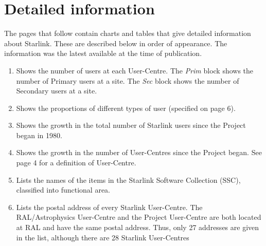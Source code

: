 \documentclass[twoside,11pt]{article}
\newenvironment{latexonly}{}{}
\newcommand{\latexonlysection}[1]{\section{#1}}
\newcommand{\latexonlysection}[1]{#1}
\begin{document}
\begin{latexonly}
\newpage

\latexonlysection{Detailed information}

The pages that follow contain charts and tables that give detailed information
about Starlink.
These are described below in order of appearance.
The information was the latest available at the time of publication.

\begin{enumerate}

\item Shows the number of users at each User-Centre.
The {\em Prim}\/ block shows the number of Primary users at a site.
The {\em Sec}\/ block shows the number of Secondary users at a site.

\item Shows the proportions of different types of user (specified on page 6).

\item Shows the growth in the total number of Starlink users since the Project
began in 1980.

\item Shows the growth in the number of User-Centres since the Project began.
See page 4 for a definition of User-Centre.

\item Lists the names of the items in the Starlink Software Collection
(SSC), classified into functional area.

\item Lists the postal address of every Starlink User-Centre.
The RAL/Astrophysics User-Centre and the Project User-Centre are both located
at RAL and have the same postal address.
Thus, only 27 addresses are given in the list, although there are 28 Starlink
User-Centres

\end{enumerate}
\end{latexonly}
\end{document}
